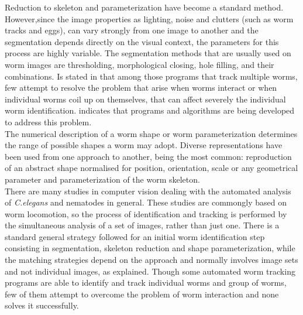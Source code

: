 Reduction to skeleton and parameterization have become a standard method. 
However,since the image properties as lighting, noise and clutters 
(such as worm tracks and eggs), can vary strongly from one image to another and 
the segmentation depends directly on the visual context, the  
parameters for this process are highly variable. The segmentation methods 
that are usually used 
on worm images are thresholding, morphological closing, 
hole filling, and their combinations.
Is stated in \cite{automated} that among those programs that track 
multiple worms, few attempt to resolve the problem that arise when 
worms interact or when individual worms coil up on themselves, that can
affect severely the individual worm identification. \cite{huang} indicates
that programs and algorithms are being developed to address this problem.\\

The  numerical description of a worm shape or worm parameterization 
determines the range of possible shapes a worm may adopt. Diverse 
representations have been used from one approach to another, being the 
most common: reproduction of an abstract shape normalised for position, 
orientation, scale or any geometrical parameter and parameterization of the 
worm skeleton.\\

There are many studies in computer vision dealing with the automated
analysis of \emph{C.elegans} and nematodes in general. These studies are
commongly based on worm locomotion, so the process of identification and 
tracking is performed by the simultaneous analysis of a set of images, rather
than just one. There is a standard general strategy followed for an initial
worm identification step consisting in segmentation, skeleton reduction and
shape parameterization, while the matching strategies depend on the approach
and normally involves image sets and not individual images, as explained.
Though some automated worm tracking programs are able to identify and track
individual worms and group of worms, few of them attempt to overcome the 
problem of worm interaction and none solves it successfully.

